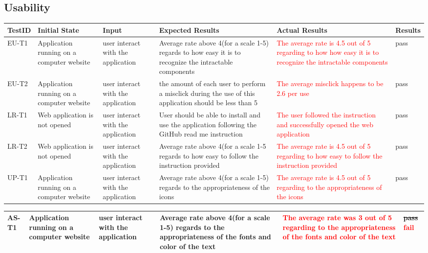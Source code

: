 \documentclass[12pt, oneside, openany, titlepage]{article}
\begin{document}
\subsection{Usability}
\begin{tabular}{ |p{1.5cm}| p{2cm} |p{2cm}| p{4cm}|p{3cm}|p{1.5cm}|   } 
 \hline
 TestID & Initial State & Input & Expected Results & Actual Results &Results \\ 
 \hline
 EU-T1 & Application running on a computer website & user interact with the application & Average rate above 4(for a scale 1-5) regards to how easy it is to recognize the intractable components  &\textcolor{red}{The average rate is 4.5 out of 5 regarding to how how easy it is to recognize the intractable components}& pass\\
  \hline
 EU-T2 & Application running on a computer website & user interact with the application & the amount of each user to perform a misclick during the use of this application should be less than 5  &\textcolor{red}{The average misclick happens to be 2.6 per use}& pass\\
  \hline
 LR-T1 & Web application is not opened & user interact with the application & User should be able to install and use the application following the GitHub read me instruction &\textcolor{red}{The user followed the instruction and successfully opened the web application}& pass\\
\hline
 LR-T2 & Web application is not opened & user interact with the application & Average rate above 4(for a scale 1-5 regards to how easy to follow the instruction provided &\textcolor{red}{The average rate is 4.5 out of 5 regarding to how easy to follow the instruction provided}& pass\\
\hline
 UP-T1 & Application running on a computer website & user interact with the application & Average rate above 4(for a scale 1-5) regards to the appropriateness of the icons  &\textcolor{red}{The average rate is 4.5 out of 5 regarding to the appropriateness of the icons}& pass\\
 \hline
 \end{tabular}
 \newpage
 \begin{tabular}{ |p{1.5cm}| p{2cm} |p{2cm}| p{4cm}|p{3cm}|p{1.5cm}|   }
 \hline
 AS-T1 & Application running on a computer website & user interact with the application & Average rate above 4(for a scale 1-5) regards to the appropriateness of the fonts and color of the text& \textcolor{red}{The average rate was 3 out of 5 regarding to the appropriateness of the fonts and color of the text} & \sout{pass} \textcolor{red}{fail}\\
 \hline
\end{tabular}	
\newline
\end{document}
